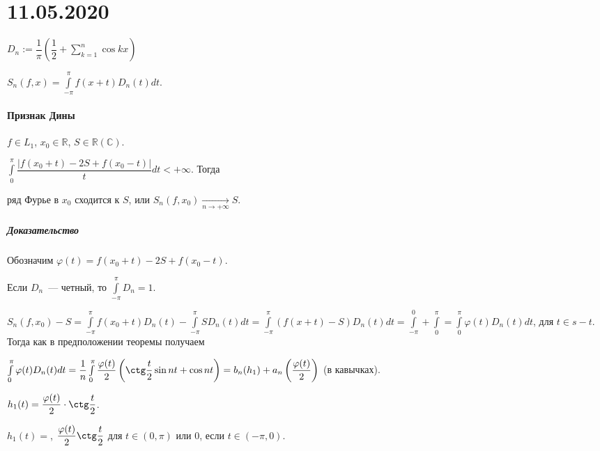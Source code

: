 \documentclass{article}
\begin{document}
\newpage

\part{11.05.2020}

    $D_n := \dfrac{1}{\pi} \left( \dfrac{1}{2} + \sum\limits^n_{k = 1} \cos {kx} \right)$
    
    $S_n(f, x) = \int\limits^{\pi}_{-\pi} f(x + t) D_n(t) dt$.
    
    \subsection{Признак Дины}
    
        $f \in L_1$, $x_0 \in \mathbb{R}$, $S \in \mathbb{R} ( \mathbb{C} )$.
        
        $\int\limits^{\pi}_0 \dfrac{\left| f(x_0 + t) - 2 S + f(x_0 - t) \right|}{t} dt < +\infty$. Тогда
        
        ряд Фурье в $x_0$ сходится к $S$, или $S_n(f, x_0) \xrightarrow[n \rightarrow +\infty]{} S$.
        
        \subsubsection{Доказательство}
        
            Обозначим $\varphi(t) = f(x_0 + t) - 2S + f(x_0 - t)$.
            
            Если $D_n$~--- четный, то $\int\limits^{\pi}_{-\pi} D_n = 1$.
            
            $S_n(f, x_0) - S = \int\limits^{\pi}_{-\pi} f(x_0 + t) D_n(t) - \int\limits^{\pi}_{-\pi} S D_n(t) dt = \int\limits^{\pi}_{-\pi} \left( f(x + t) - S \right) D_n(t) dt = \int\limits^0_{-\pi} + \int\limits^{\pi}_0 = \int\limits^{\pi}_0 \varphi(t) D_n(t) dt$, для $t \in s - t$. Тогда как в предположении теоремы получаем
            
            $\int\limits^{\pi}_0 \varphi(t) D_n(t) dt = \dfrac{1}{n} \int\limits_0^{\pi} \dfrac{\varphi(t)}{2} \left( \ctg \dfrac{t}{2} \sin {nt} + \cos {nt} \right) = b_n(h_1) + a_n \left( \dfrac{\varphi(t)}{2} \right)$ (в кавычках).
            
            $h_1(t) = \dfrac{\varphi(t)}{2} \cdot \ctg \dfrac{t}{2}$.
            
            $h_1(t) = $, $\dfrac{\varphi(t)}{2} \ctg \dfrac{t}{2}$ для $t \in (0, \pi)$ или $0$, если $t \in (-\pi, 0)$.
            
\end{document}
